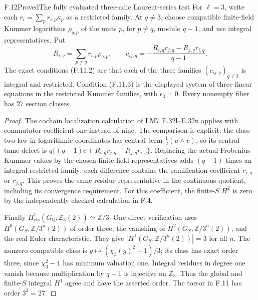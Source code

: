 \begin{statement}{F.12}{Proved}{The fully evaluated three-adic Laurent-series test}
For $\ell=3$, write each $r_i=\sum_p r_{i,p}\kappa_p$ as a restricted
family. At $q\ne3$, choose compatible finite-field Kummer logarithms
$\rho_{q,p}$ of the units $p$, for $p\ne q$, modulo $q-1$, and
use integral representatives. Put
\[
 R_{i,q}=\sum_{p\ne q}r_{i,p}\rho_{q,p},\qquad
 c_{ij,q}=-\frac{R_{i,q}r_{j,q}-R_{j,q}r_{i,q}}{q-1}.
\]
The exact conditions (F.11.2) are that each of the three families
$(c_{ij,q})_{q\ne3}$ is integral and restricted.
Condition (F.11.3) is the displayed system of three linear
equations in the restricted Kummer families, with
$\epsilon_3=0$. Every nonempty fiber has $27$ section classes.
\end{statement}
\begin{proof}
The cochain localization calculation of LM7 E.32l--E.32n applies
with commutator coefficient one instead of nine. The comparison
is explicit: the class-two law in logarithmic coordinates has
central term $\tfrac12(u\wedge v)$, so its central tame defect is
$q\{(q-1)c+R_{i,q}r_{j,q}-R_{j,q}r_{i,q}\}$.
Replacing the actual Frobenius Kummer values by the chosen finite-field
representatives adds $(q-1)$ times an integral restricted family:
each difference contains the ramification coefficient
$r_{i,q}$ or $r_{j,q}$. This proves the same residue representative
in the continuous quotient, including its convergence requirement.
For this coefficient, the finite-$S$ $H^2$ is zero by the
independently checked calculation in F.4.

Finally $H^1_{\mathrm{cts}}(G_{\mathbb Q},\mathbb Z_3(2))
\simeq\mathbb Z/3$. One direct verification uses
$H^0(G_S,\mathbb Z/3^n(2))$ of order three, the vanishing of
$H^2(G_S,\mathbb Z/3^n(2))$, and the real Euler characteristic.
They give $|H^1(G_S,\mathbb Z/3^n(2))|=3$ for all $n$.
The nonzero compatible class is
$g\mapsto(\chi_3(g)^2-1)/3$; its class has exact order three,
since $\chi_3^2-1$ has minimum valuation one.
Integral residues in degree one vanish because multiplication
by $q-1$ is injective on $\mathbb Z_3$.
Thus the global and finite-$S$ integral $H^1$ agree and have
the asserted order. The torsor in F.11 has order $3^3=27$.
\end{proof}
